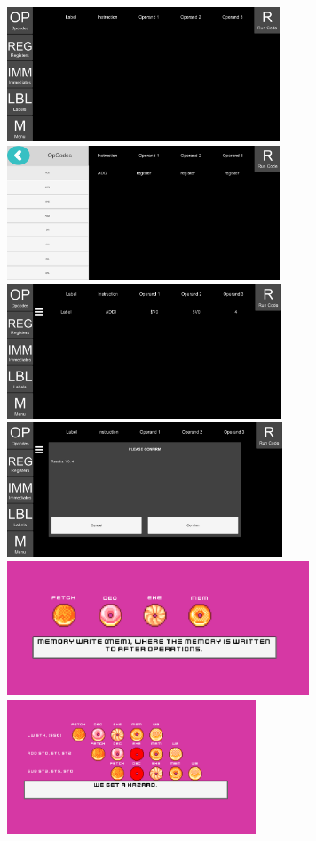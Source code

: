 \documentclass[12pt]{article}
\begin{document}
	\includegraphics[height=4cm]{MIPSSimulatorStart.png}
	\includegraphics[height=4cm]{MIPSSimulatorProgress.png}\\
	\includegraphics[height=4cm]{MIPSSimulatorReady.png}
	\includegraphics[height=4cm]{MIPSSimulatorRun.png}\\
	\includegraphics[height=4cm]{PipelineBakeryTut.png}
	\includegraphics[height=4cm]{PipelineBakeryTut2.png}\\
\end{document}
